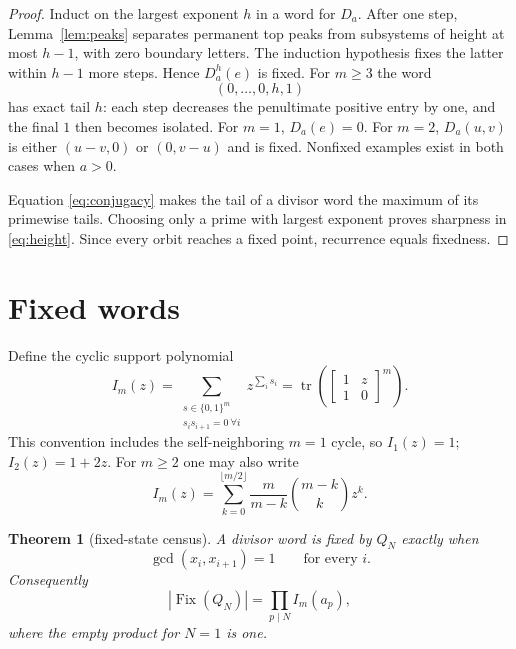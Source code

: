 \documentclass[a4paper,11pt]{amsart}
\newtheorem{theorem}{Theorem}[section]
\theoremstyle{remark}
\newcommand{\Fix}{\operatorname{Fix}}
\newcommand{\tr}{\operatorname{tr}}
\begin{document}
\begin{proof}
Induct on the largest exponent $h$ in a word for $D_a$.  After one step,
Lemma~\ref{lem:peaks} separates permanent top peaks from subsystems of height
at most $h-1$, with zero boundary letters.  The induction hypothesis fixes
the latter within $h-1$ more steps.  Hence $D_a^h(e)$ is fixed.  For $m\geq3$
the word
\[
 (0,\ldots,0,h,1)
\]
has exact tail $h$: each step decreases the penultimate positive entry by
one, and the final $1$ then becomes isolated.  For $m=1$, $D_a(e)=0$.  For
$m=2$, $D_a(u,v)$ is either $(u-v,0)$ or $(0,v-u)$ and is fixed.  Nonfixed
examples exist in both cases when $a>0$.

Equation \eqref{eq:conjugacy} makes the tail of a divisor word the maximum of
its primewise tails.  Choosing only a prime with largest exponent proves
sharpness in \eqref{eq:height}.  Since every orbit reaches a fixed point,
recurrence equals fixedness.
\end{proof}

\section{Fixed words}

Define the cyclic support polynomial
\begin{equation}\label{eq:Im}
 I_m(z)=\sum_{\substack{s\in\{0,1\}^m\\s_is_{i+1}=0\ \forall i}}
 z^{\sum_i s_i}
 =\tr\left(\begin{bmatrix}1&z\\1&0\end{bmatrix}^{m}\right).
\end{equation}
This convention includes the self-neighboring $m=1$ cycle, so $I_1(z)=1$;
$I_2(z)=1+2z$.  For $m\geq2$ one may also write
\begin{equation}\label{eq:Iclosed}
 I_m(z)=\sum_{k=0}^{\lfloor m/2\rfloor}
 \frac{m}{m-k}\binom{m-k}{k}z^k.
\end{equation}

\begin{theorem}[fixed-state census]\label{thm:fixed}
A divisor word is fixed by $Q_N$ exactly when
\begin{equation}\label{eq:coprime}
 \gcd(x_i,x_{i+1})=1\qquad\text{for every }i.
\end{equation}
Consequently
\begin{equation}\label{eq:fixedcount}
 |\Fix(Q_N)|=\prod_{p\mid N} I_m(a_p),
\end{equation}
where the empty product for $N=1$ is one.
\end{theorem}
\end{document}
